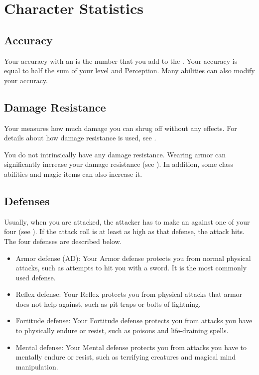 \section{Character Statistics}\label{Character Statistics}

    \subsection{Accuracy}\label{Accuracy}
        Your accuracy with an  is the number that you add to the .
        Your accuracy is equal to half the sum of your level and Perception.
        Many abilities can also modify your accuracy.

    \subsection{Damage Resistance}\label{Damage Resistance}
        Your  measures how much damage you can shrug off without any effects.
        For details about how damage resistance is used, see .

        You do not intrinsically have any damage resistance.
        Wearing armor can significantly increase your damage resistance (see ).
        In addition, some class abilities and magic items can also increase it.

    \subsection{Defenses}\label{Defenses}
        Usually, when you are attacked, the attacker has to make an  against one of your four  (see ).
        If the attack roll is at least as high as that defense, the attack hits.
        The four defenses are described below.
        \begin{itemize}
            \item Armor defense (AD): Your Armor defense protects you from normal physical attacks, such as attempts to hit you with a sword.
                It is the most commonly used defense.
            \item Reflex defense: Your Reflex protects you from physical attacks that armor does not help against, such as pit traps or bolts of lightning.
            \item Fortitude defense: Your Fortitude defense protects you from attacks you have to physically endure or resist, such as poisons and life-draining spells.
            \item Mental defense: Your Mental defense protects you from attacks you have to mentally endure or resist, such as terrifying creatures and magical mind manipulation.
        \end{itemize}

